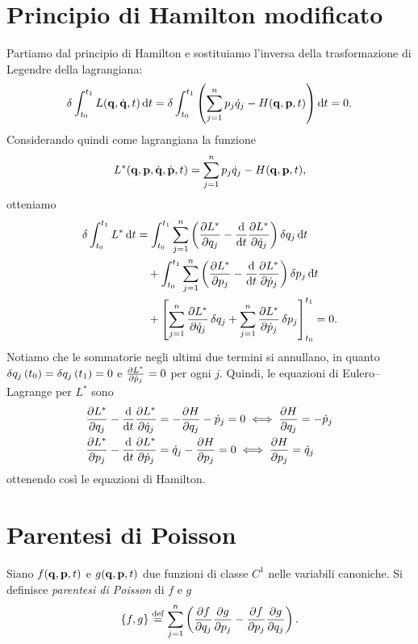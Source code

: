 \section{Principio di Hamilton modificato}
Partiamo dal principio di Hamilton e sostituiamo l'inversa della trasformazione di Legendre della lagrangiana:
\begin{equation*}
    \var \int_{t_0}^{t_1} L(\vb{q}, \dot{\vb{q}}, t) \dd{t} = \var \int_{t_0}^{t_1} \left( \sum_{j=1}^n p_j \dot{q}_j - H(\vb{q}, \vb{p}, t) \right) \dd{t} = 0.
\end{equation*}
Considerando quindi come lagrangiana la funzione
\begin{equation*}
    L^*(\vb{q}, \vb{p}, \dot{\vb{q}}, \dot{\vb{p}}, t) = \sum_{j=1}^n p_j \dot{q}_j - H(\vb{q}, \vb{p}, t),
\end{equation*}
otteniamo
\begin{align*}
    \var \int_{t_0}^{t_1} L^* \dd{t}
    &= \int_{t_0}^{t_1} \sum_{j=1}^n \left( \pdv{L^*}{q_j} - \dv{t}\pdv{L^*}{\dot{q}_j} \right) \var{q_j} \dd{t}  \\
    &\quad + \int_{t_0}^{t_1} \sum_{j=1}^n \left( \pdv{L^*}{p_j} - \dv{t}\pdv{L^*}{\dot{p}_j} \right) \var{p_j} \dd{t} \\
    &\quad + \left[\sum_{j=1}^n \pdv{L^*}{\dot{q}_j} \var{q_j}+ \sum_{j=1}^n \pdv{L^*}{\dot{p}_j} \var{p_j} \right]_{t_0}^{t_1} = 0.
\end{align*}
Notiamo che le sommatorie negli ultimi due termini si annullano, in quanto $\var{q_j}(t_0) = \var{q_j}(t_1) = 0$ e $\pdv{L^*}{\dot{p}_j} = 0$ per ogni $j$.
Quindi, le equazioni di Eulero--Lagrange per $L^*$ sono
\begin{align*}
    \pdv{L^*}{q_j} - \dv{t}\pdv{L^*}{\dot{q}_j} &= - \pdv{H}{q_j} - \dot{p}_j = 0 \iff \pdv{H}{q_j} = - \dot{p}_j \\
    \pdv{L^*}{p_j} - \dv{t}\pdv{L^*}{\dot{p}_j} &= \dot{q}_j - \pdv{H}{p_j} = 0 \iff \pdv{H}{p_j} = \dot{q}_j
\end{align*}
ottenendo così le equazioni di Hamilton.

\section{Parentesi di Poisson}
\begin{definition}
    Siano $f(\vb{q}, \vb{p}, t)$ e $g(\vb{q}, \vb{p}, t)$ due funzioni di classe $C^1$ nelle variabili canoniche. Si definisce \emph{parentesi di Poisson} di $f$ e $g$
    \begin{equation*}
        \pb{f}{g} \defeq \sum_{j=1}^n \left( \pdv{f}{q_j} \pdv{g}{p_j} - \pdv{f}{p_j} \pdv{g}{q_j} \right).
    \end{equation*}
\end{definition}

